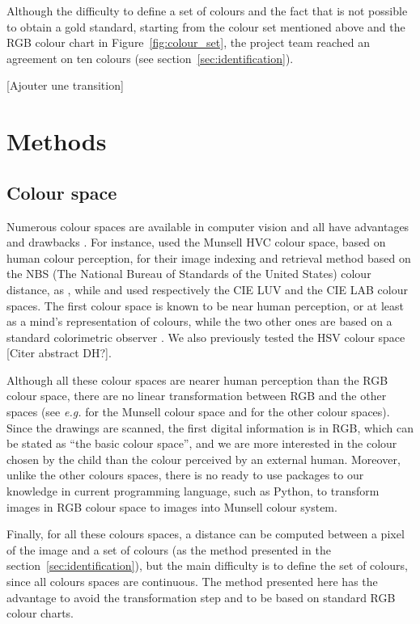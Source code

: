 \documentclass[11pt,a4paper]{article}
\begin{document}
Although the difficulty to define a set of colours and the fact that is not possible to obtain a gold standard, starting from the colour set mentioned above and the RGB colour chart in Figure~\ref{fig:colour_set}, the project team reached an agreement on ten colours (see section~\ref{sec:identification}).

{\color{red} [Ajouter une transition]}


\section{Methods}\label{methods}

\subsection{Colour space}
\label{sec:colour-space}

Numerous colour spaces are available in computer vision and all have advantages and drawbacks \cite{tkalcictasic2003}.  
For instance, \citet{GongProiettiFaloutsos1998} used the Munsell HVC colour space, based on human colour perception, for their image indexing and retrieval method based on the NBS (The National Bureau of Standards of the United States) colour distance, as \citet{kimbaelee2007}, while \citet{yendrikhovskij2001} and \citet{konyushkova2015} used respectively the CIE LUV and the CIE LAB colour spaces.
The first colour space is known to be near human perception, or at least as a mind's representation of colours, while the two other ones are based on a standard colorimetric observer \cite{tkalcictasic2003}.
We also previously tested the HSV colour space {\color{red} [Citer abstract DH?]}.

Although all these colour spaces are nearer human perception than the RGB colour space, there are no linear transformation between RGB and the other spaces (see \textit{e.g.} \citealt{zhangsokhansanjwuetal1998} for the Munsell colour space and \citealt{tkalcictasic2003} for the other colour spaces). 
Since the drawings are scanned, the first digital information is in RGB, which can be stated as ``the basic colour space''\cite{tkalcictasic2003}, and we are more interested in the colour chosen by the child than the colour perceived by an external human.
Moreover, unlike the other colours spaces, there is no ready to use packages to our knowledge in current programming language, such as Python, to transform images in RGB colour space to images into Munsell colour system.

Finally, for all these colours spaces, a distance can be computed between a pixel of the image and a set of colours (as the method presented in the section~\ref{sec:identification}), but the main difficulty is to define the set of colours, since all colours spaces are continuous. 
The method presented here has the advantage to avoid the transformation step and to be based on standard RGB colour charts.
\end{document}

